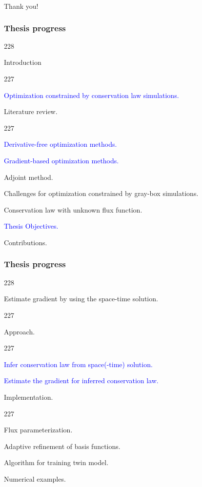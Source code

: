 \documentclass{beamer}
\newcommand{\barrow}{\item[\color{darkred}\ding{228}]}
\newcommand{\carrow}{\item[\color{darkred}\ding{227}]}
\begin{document}
\setcounter{framenumber}{46}
\begin{frame}
    \begin{center}
        Thank you!
    \end{center}
\end{frame}

\begin{frame}
    \frametitle{Thesis progress}
    \begin{dinglist}{228}
        \barrow Introduction
        \begin{dinglist}{227}
            \carrow \textcolor{blue}{Optimization constrained by conservation law simulations.}
            \carrow Literature review.
            \begin{dinglist}{227}
                \carrow \textcolor{blue}{Derivative-free optimization methods.}
                \carrow \textcolor{blue}{Gradient-based optimization methods.}
                \carrow Adjoint method.
            \end{dinglist}
            \carrow Challenges for optimization constrained by gray-box simulations.
            \carrow Conservation law with unknown flux function.
            \carrow \textcolor{blue}{Thesis Objectives.}
            \carrow Contributions.
        \end{dinglist}
    \end{dinglist}
\end{frame}

\begin{frame}
    \frametitle{Thesis progress}
    \begin{dinglist}{228}
        \barrow Estimate gradient by using the space-time solution.
        \begin{dinglist}{227}
            \carrow Approach.
            \begin{dinglist}{227}
                \carrow \textcolor{blue}{Infer conservation law from space(-time) solution.}
                \carrow \textcolor{blue}{Estimate the gradient for inferred conservation law.}
            \end{dinglist}
            \carrow Implementation.
            \begin{dinglist}{227}
                \carrow Flux parameterization.
                \carrow Adaptive refinement of basis functions.
                \carrow Algorithm for training twin model.
                \carrow Numerical examples.
            \end{dinglist}
        \end{dinglist}
    \end{dinglist}
\end{frame}
\end{document}
